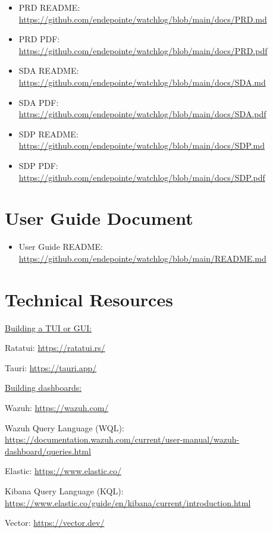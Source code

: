 \documentclass{article}
\begin{document}
\begin{itemize}[label=]
    \item PRD README: \url{https://github.com/endepointe/watchlog/blob/main/docs/PRD.md}
    \item PRD PDF: \url{https://github.com/endepointe/watchlog/blob/main/docs/PRD.pdf}
    \item SDA README: \url{https://github.com/endepointe/watchlog/blob/main/docs/SDA.md}
    \item SDA PDF: \url{https://github.com/endepointe/watchlog/blob/main/docs/SDA.pdf}
    \item SDP README: \url{https://github.com/endepointe/watchlog/blob/main/docs/SDP.md}
    \item SDP PDF: \url{https://github.com/endepointe/watchlog/blob/main/docs/SDP.pdf}
\end{itemize}


\section{User Guide Document}

\begin{itemize}
    \item User Guide README: \url{https://github.com/endepointe/watchlog/blob/main/README.md}
\end{itemize}


\section{Technical Resources}

\underline{Building a TUI or GUI:}\vspace{0.25cm}

Ratatui: \url{https://ratatui.rs/}

Tauri: \url{https://tauri.app/}\vspace{0.25cm}

\underline{Building dashboards:}\vspace{0.25cm}

Wazuh: \url{https://wazuh.com/}

Wazuh Query Language (WQL): \url{https://documentation.wazuh.com/current/user-manual/wazuh-dashboard/queries.html}

Elastic: \url{https://www.elastic.co/}

Kibana Query Language (KQL): \url{https://www.elastic.co/guide/en/kibana/current/introduction.html}

Vector: \url{https://vector.dev/}\vspace{0.25cm}
\end{document}
